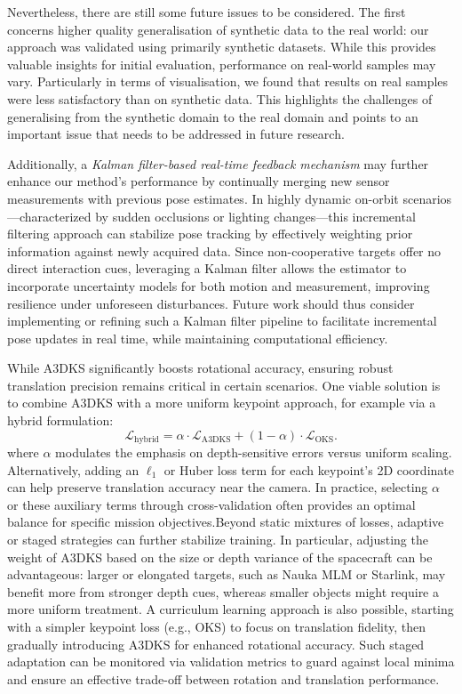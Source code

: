 \documentclass[a4paper,fleqn]{cas-sc}
\begin{document}
Nevertheless, there are still some future issues to be considered. The first concerns higher 
quality generalisation of synthetic data to the real world: our approach was validated using 
primarily synthetic datasets. While this provides valuable insights for initial evaluation, 
performance on real-world samples may vary. Particularly in terms of visualisation, we found 
that results on real samples were less satisfactory than on synthetic data. This highlights 
the challenges of generalising from the synthetic domain to the real domain and points to an 
important issue that needs to be addressed in future research. 


Additionally, a \textit{Kalman filter-based real-time feedback mechanism} may further enhance 
our method’s performance by continually merging new sensor measurements with previous pose 
estimates. In highly dynamic on-orbit scenarios—characterized by sudden occlusions or 
lighting changes—this incremental filtering approach can stabilize pose tracking by effectively 
weighting prior information against newly acquired data. Since non-cooperative targets offer 
no direct interaction cues, leveraging a Kalman filter allows the estimator to incorporate 
uncertainty models for both motion and measurement, improving resilience under unforeseen 
disturbances. Future work should thus consider implementing or refining such a Kalman 
filter pipeline to facilitate incremental pose updates in real time, while maintaining 
computational efficiency.


While A3DKS significantly boosts rotational accuracy, ensuring robust translation precision remains 
critical in certain scenarios. One viable solution is to combine A3DKS with a more uniform keypoint 
approach, for example via a hybrid formulation:
\begin{equation}
        \mathcal{L}_{\text{hybrid}} 
    = \alpha \cdot \mathcal{L}_{\text{A3DKS}} 
    + (1-\alpha)\cdot \mathcal{L}_{\text{OKS}}.
\end{equation}
where $\alpha$ modulates the emphasis on depth-sensitive errors versus uniform scaling. Alternatively, 
adding an $\ell_1$ or Huber loss term for each keypoint’s 2D coordinate can help preserve translation 
accuracy near the camera. In practice, selecting $\alpha$ or these auxiliary terms through 
cross-validation often provides an optimal balance for specific mission objectives.Beyond static mixtures of losses, adaptive or staged strategies can further stabilize training. In particular, adjusting the weight of A3DKS based on the size or depth variance of the spacecraft can be advantageous: larger or elongated targets, such as Nauka MLM or Starlink, may benefit more from stronger depth cues, whereas smaller objects might require a more uniform treatment. A curriculum learning approach is also possible, starting with a simpler keypoint loss (e.g., OKS) to focus on translation fidelity, then gradually introducing A3DKS for enhanced rotational accuracy. Such staged adaptation can be monitored via validation metrics to guard against local minima and ensure an 
effective trade-off between rotation and translation performance.
\end{document}
